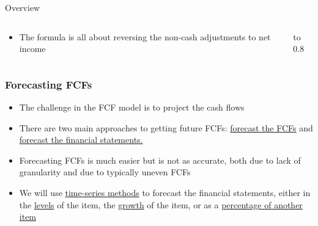 \documentclass[handout, 11pt]{beamer}
\begin{document}
\begin{section}{Overview}
\begin{frame}
\begin{columns}
\begin{column}{0.5\textwidth}
{\begin{itemize}
\vfill
\item The formula is all about reversing the non-cash adjustments to net income
\end{itemize}}
\end{column}
\begin{column}{0.5\textwidth}
\vbox to 0.8
\end{column}
\end{columns}
\end{frame}
\begin{frame}
\frametitle{Forecasting FCFs}
\begin{itemize}
\item The challenge in the FCF model is to project the cash flows
\vfill
\item There are two main approaches to getting future FCFs:
\underline{forecast the FCFs}
and
\underline{forecast the financial statements.}
\vfill
\item Forecasting FCFs is much easier but is not as accurate, both due to lack of granularity and due to typically uneven FCFs
\vfill
\item We will use
\underline{time-series methods}
to forecast the financial statements, either in the
\underline{levels}
of the item, the
\underline{growth}
of the item, or as a
\underline{percentage of another item}
\end{itemize}
\end{frame}
\end{section}
\end{document}
